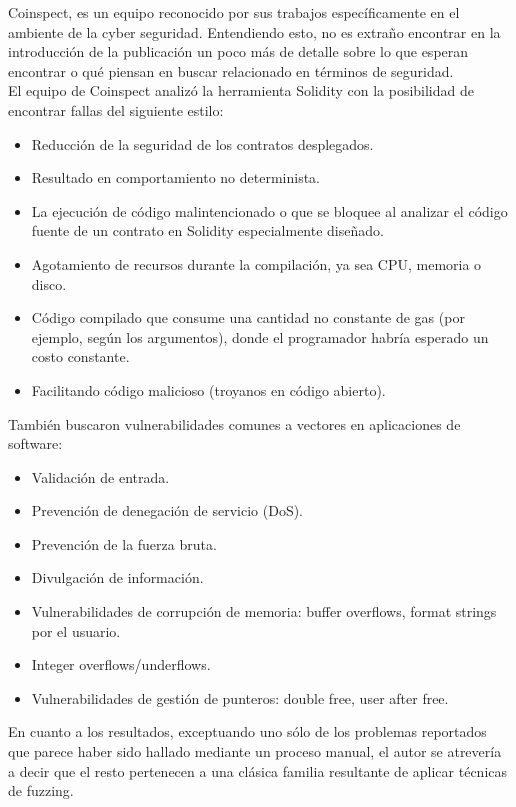 Coinspect, es un equipo reconocido por sus trabajos específicamente en el ambiente de la cyber seguridad. Entendiendo esto, no es extraño encontrar en la introducción de la publicación\cite{SolidityCompilerAuditReport} un poco más de detalle\cite{SummaryCoinspectReport} sobre lo que esperan encontrar o qué piensan en buscar relacionado en términos de seguridad.\\

El equipo de Coinspect analizó la herramienta Solidity con la posibilidad de encontrar fallas del siguiente estilo:
\begin{itemize}
    \item Reducción de la seguridad de los contratos desplegados.
    \item Resultado en comportamiento no determinista.
    \item La ejecución de código malintencionado o que se bloquee al analizar el código fuente de un contrato en Solidity especialmente diseñado.
    \item Agotamiento de recursos durante la compilación, ya sea CPU, memoria o disco.
    \item Código compilado que consume una cantidad no constante de gas (por ejemplo, según los argumentos), donde el programador habría esperado un costo constante.
    \item Facilitando código malicioso (troyanos en código abierto).\newline
\end{itemize}

También buscaron vulnerabilidades comunes a vectores en aplicaciones de software:
\begin{itemize}
    \item Validación de entrada.
    \item Prevención de denegación de servicio (DoS).
    \item Prevención de la fuerza bruta.
    \item Divulgación de información.
    \item Vulnerabilidades de corrupción de memoria: buffer overflows, format strings por el usuario.
    \item Integer overflows/underflows.
    \item Vulnerabilidades de gestión de punteros: double free, user after free.
\end{itemize}


En cuanto a los resultados, exceptuando uno sólo de los problemas reportados que parece haber sido hallado mediante un proceso manual, el autor se atrevería a decir que el resto pertenecen a una clásica familia resultante de aplicar técnicas de fuzzing.\\


